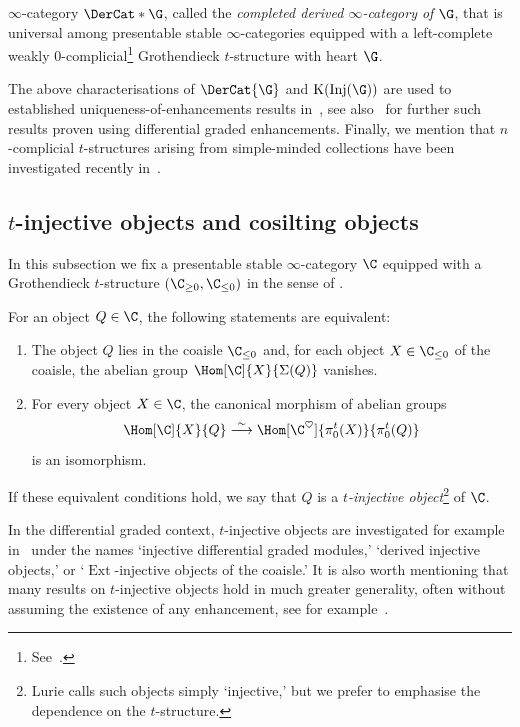 \documentclass[a4paper]{amsart}
\begin{document}
\begin{remark}
\begin{itemize}
  $\infty$-category $\DerCat*{\G}$, called the \emph{completed derived
    $\infty$-category of $\G$}, that is universal among presentable stable
  $\infty$-categories equipped with a left-complete weakly
  $0$-com\-pli\-cial\footnote{See~\cite[Definition~C.5.5.13]{Lur18SAG}.}
  Grothendieck $t$-structure with heart $\G$.
\end{itemize}
The above characterisations of $\DerCat{\G}$ and
$\operatorname{K}(\operatorname{Inj}(\G))$ are used to established
uniqueness-of-enhancements results in~\cite{Ant18}, see also~\cite{CNS22} for
further such results proven using differential graded enhancements. Finally, we
mention that $n$-com\-pli\-cial $t$-structures arising from simple-minded
collections have been investigated recently in~\cite{Plo26}.
\end{remark}

\subsection{$t$-injective objects and cosilting objects}

In this subsection we fix a presentable stable $\infty$-category $\C$ equipped
with a Grothendieck $t$-structure $(\C_{\geq0},\C_{\leq0})$ in the sense of
.

\begin{defprop}
  \label{defprop:injectives}
  For an object $Q\in\C$, the following statements are equivalent:
  \begin{enumerate}
  \item The object $Q$ lies in the coaisle $\C_{\leq0}$ and, for each object
    $X\in\C_{\leq0}$ of the coaisle, the abelian group $\Hom[\C]{X}{\Sigma(Q)}$
    vanishes.
  \item For every object $X\in\C$, the canonical morphism of abelian groups
    \[
      \Hom[\C]{X}{Q}\stackrel{\sim}{\longrightarrow}\Hom[\C^\heartsuit]{\pi_0^t(X)}{\pi_0^t(Q)}
    \]
    is an isomorphism.
  \end{enumerate}
  If these equivalent conditions hold, we say that $Q$ is a \emph{$t$-injective
    object}\footnote{Lurie calls such objects simply `injective,' but we prefer
    to emphasise the dependence on the $t$-structure.} of $\C$.
\end{defprop}

\begin{remark}
  In the differential graded context, $t$-injective objects are investigated for
  example in~\cite{Sha18,GLVdB21,GRG23,SS23} under the names `injective
  differential graded
  modules,' `derived injective objects,' or `$\operatorname{Ext}$-injective
  objects of the coaisle.' It is also worth mentioning that many results on
  $t$-injective objects hold in much greater generality, often without assuming
  the existence of any enhancement, see for example~\cite{SS23}.
\end{remark}
\end{document}

